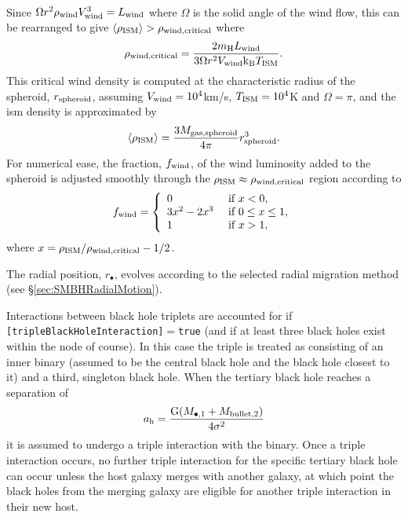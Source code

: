 \begin{description}
\begin{eqnarray}
\end{eqnarray}
Since $\Omega r^2 \rho_{\rm wind} V_{\rm wind}^3 = L_{\rm wind}$ where $\Omega$ is the solid angle of the wind flow, this can be rearranged to give $\langle\rho_{\rm ISM}\rangle > \rho_{\rm wind, critical}$ where
\begin{equation}
\rho_{\rm wind,critical} = {2 m_{\rm H} L_{\rm wind} \over 3 \Omega r^2 V_{\rm wind} {\rm k_B} T_{\rm ISM}}.
\end{equation}
This critical wind density is computed at the characteristic radius of the spheroid, $r_{\rm spheroid}$, assuming $V_{\rm wind}=10^4$km/s, $T_{\rm ISM}=10^4$K and $\Omega=\pi$, and the \gls{ism} density is approximated by
\begin{equation}
 \langle\rho_{\rm ISM}\rangle = {3 M_{\rm gas, spheroid} \over 4 \pi} r_{\rm spheroid}^3.
\end{equation}
For numerical ease, the fraction, $f_{\rm wind}$, of the wind luminosity added to the spheroid is adjusted smoothly through the $\rho_{\rm ISM}\approx\rho_{\rm wind,critical}$ region according to
\begin{equation}
 f_{\rm wind} = \left\{ \begin{array}{ll} 0 & \hbox{ if } x < 0, \\ 3x^2-2x^3 & \hbox{ if } 0 \le x \le 1, \\ 1 & \hbox{ if } x > 1, \end{array} \right.
\end{equation}
where $x=\rho_{\rm ISM}/\rho_{\rm wind,critical}-1/2$.
\end{description}

The radial position, $r_\bullet$, evolves according to the selected radial migration method (see \S\ref{sec:SMBHRadialMotion}).

Interactions between black hole triplets are accounted for if {\tt [tripleBlackHoleInteraction]}$=${\tt true} (and if at least three black holes exist within the \gls{node} of course). In this case the triple is treated as consisting of an inner binary (assumed to be the central black hole and the black hole closest to it) and a third, singleton black hole. When the tertiary black hole reaches a separation of 
\begin{equation}
a_{\rm h}= {{\rm G} (M_{\bullet, 1} + M_{\rm bullet, 2}) \over 4 \sigma^2}
\end{equation}
it is assumed to undergo a triple interaction with the binary. Once a triple interaction occurs, no further triple interaction for the specific tertiary black hole can occur unless the host galaxy merges with another galaxy, at which point the black holes from the merging galaxy are eligible for another triple interaction in their new host.

